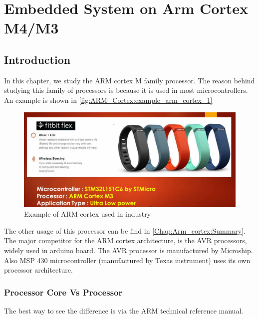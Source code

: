 


\chapter{Embedded System on Arm Cortex M4/M3}
\label{chap:arm_cortex}

\section{Introduction}

In this chapter, we study the ARM cortex M family processor. The reason behind studying this family of processors is because it is used in most microcontrollers. An example is shown in \autoref{fig:ARM_Cortex:example_arm_cortex_1}


\begin{figure}[h]
\centering
\includegraphics[scale=0.55]{Figures/ARM_Cortex/example_arm_cortex_1}
\caption{Example of ARM cortex used in industry}
\label{fig:ARM_Cortex:example_arm_cortex_1}
\end{figure}

The other usage of this processor can be find in \autoref{Chap:Arm_cortex:Summary}.\\

The major competitor for the ARM cortex architecture, is the AVR processors, widely used in arduino board. The AVR processor is manufactured by Microship. Also MSP 430 microcontroller (manufactured by Texas instrument) uses its own processor architecture.

\newpage
\subsection{Processor Core Vs Processor}

The best way to see the difference is via the ARM technical reference manual.\\


